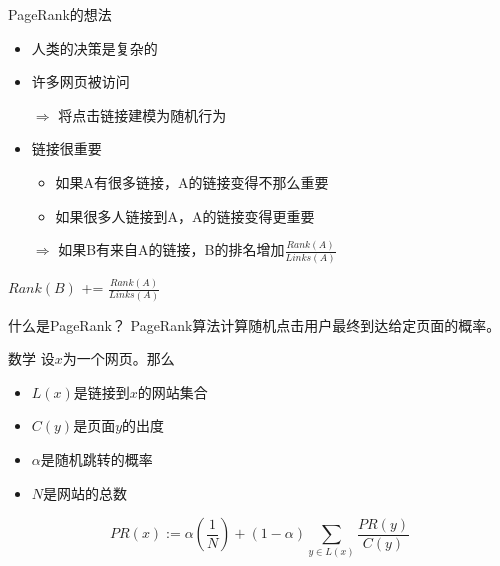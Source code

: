 \begin{frame}{PageRank的想法}
    \begin{itemize}[<+->]
        \item 人类的决策是复杂的
        \item 许多网页被访问
        \item[$\Rightarrow$] 将点击链接建模为随机行为
        \item 链接很重要
        \begin{itemize}
            \item 如果A有很多链接，A的链接变得不那么重要
            \item 如果很多人链接到A，A的链接变得更重要
        \end{itemize}
        \item[$\Rightarrow$] 如果B有来自A的链接，B的排名增加$\frac{Rank(A)}{Links(A)}$
    \end{itemize}

    \pause[\thebeamerpauses]

    \begin{algorithmic}
            \State $Rank(B)$ += $\frac{Rank(A)}{Links(A)}$
        \EndIf
    \end{algorithmic}
\end{frame}

\begin{frame}{什么是PageRank？}
    PageRank算法计算随机点击用户最终到达给定页面的概率。
\end{frame}




\begin{frame}{数学}
    设$x$为一个网页。那么
    \begin{itemize}
        \item $L(x)$是链接到$x$的网站集合
        \item $C(y)$是页面$y$的出度
        \item $\alpha$是随机跳转的概率
        \item $N$是网站的总数
    \end{itemize}

    \[\displaystyle PR(x) := \alpha \left ( \frac{1}{N} \right ) + (1-\alpha) \sum_{y\in L(x)} \frac{PR(y)}{C(y)}\]
\end{frame}

